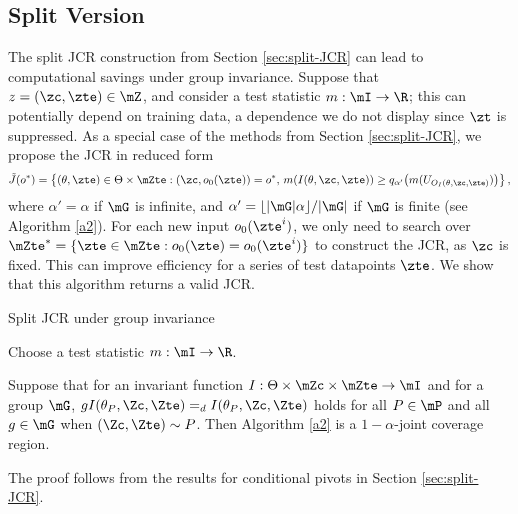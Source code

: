 \documentclass[english]{article}
\begin{document}
\subsection{Split Version}\label{sec:split-JCR-invariance}
The split JCR construction from Section \ref{sec:split-JCR}
can lead to computational savings under group invariance.
Suppose
that $z=(\zc,\zte) \in \mZ$, 
and 
consider a test statistic $m: \mI \to \R$;
this can potentially depend on  training data, a dependence we do not display since $\zt$ is suppressed.
As a special case of the methods from Section \ref{sec:split-JCR}, we propose the JCR in reduced form
\begin{align}\label{eq:split-group-inv}
    \tilde J(o^*) = \left\{(\theta,\zte) \in \Theta \times \mZte: (\zc,o_0(\zte)) = o^*,\, m(I(\theta,\zc,\zte)) \ge q_{\alpha'}
\big(m(U_{O_I(\theta,\zc,\zte)})\big) \right\},
\end{align}
where $\alpha' = \alpha$ if $\mG$ is infinite, 
and $\alpha' = \lfloor |\mG|\alpha\rfloor/|\mG|$ if $\mG$ is finite (see Algorithm \ref{a2}).
For each new input $o_0(\zte^i)$, 
we only need to search over $\mZte^* = \{\zte \in \mZte: o_0(\zte) = o_0(\zte^i)\}$ to construct the JCR, as $\zc$ is fixed. 
This can improve efficiency for a series of test datapoints $\zte$.
We show that this algorithm returns a valid JCR.

\begin{algorithm}%
\caption{Split JCR under group invariance}
{}
{Choose a test statistic $m: \mI \to \R$.}\\
\label{a2}
\end{algorithm}

\begin{proposition}\label{general JCR-split}
Suppose that for an invariant function $I:\Theta \times \mZc \times \mZte \to \mI$ and for a group $\mG$, $gI(\theta_P,\Zc,\Zte) =_d I(\theta_P,\Zc,\Zte)$ holds for all $P \in \mP$ and all $g\in \mG$ when $(\Zc,\Zte) \sim P$. Then 
Algorithm \ref{a2} is a $1-\alpha$-joint coverage region. %

\end{proposition}
The proof follows from 
the results for conditional pivots in Section \ref{sec:split-JCR}. 
\end{document}

